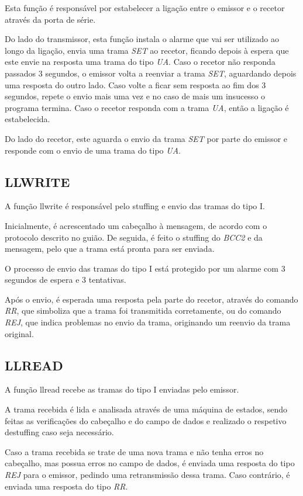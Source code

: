 \documentclass[11pt]{article}
\begin{document}
Esta função é responsável por estabelecer a ligação entre o emissor e o recetor através da porta de série.

Do lado do transmissor, esta função instala o alarme que vai ser utilizado ao longo da ligação, envia uma trama \textit{SET} ao recetor, ficando depois à espera que este envie na resposta uma trama do tipo \textit{UA}. Caso o recetor não responda passados 3 segundos, o emissor volta a reenviar a trama \textit{SET}, aguardando depois uma resposta do outro lado. Caso volte a ficar sem resposta ao fim dos 3 segundos, repete o envio mais uma vez e no caso de mais um insucesso o programa termina. Caso o recetor responda com a trama \textit{UA}, então a ligação é estabelecida.

Do lado do recetor, este aguarda o envio da trama \textit{SET} por parte do emissor e responde com o envio de uma trama do tipo \textit{UA}.

\subsection{LLWRITE}

A função llwrite é responsável pelo stuffing e envio das tramas do tipo I.

Inicialmente, é acrescentado um cabeçalho à mensagem, de acordo com o protocolo descrito no guião. De seguida, é feito o stuffing do \textit{BCC2} e da mensagem, pelo que a trama está pronta para ser enviada.

O processo de envio das tramas do tipo I está protegido por um alarme com 3 segundos de espera e 3 tentativas.

Após o envio, é esperada uma resposta pela parte do recetor, através do comando \textit{RR}, que simboliza que a trama foi transmitida corretamente, ou do comando \textit{REJ}, que indica problemas no envio da trama, originando um reenvio da trama original.

\subsection{LLREAD}

A função llread recebe as tramas do tipo I enviadas pelo emissor.

A trama recebida é lida e analisada através de uma máquina de estados, sendo feitas as verificações do cabeçalho e do campo de dados e realizado o respetivo destuffing caso seja necessário.

Caso a trama recebida se trate de uma nova trama e não tenha erros no cabeçalho, mas possua erros no campo de dados, é enviada uma resposta do tipo \textit{REJ} para o emissor, pedindo uma retransmissão dessa trama. Caso contrário, é enviada uma resposta do tipo \textit{RR}.
\end{document}
